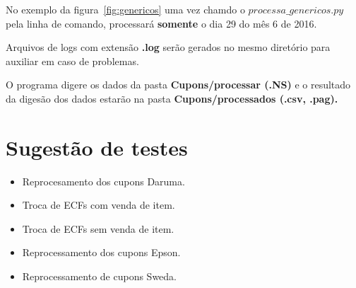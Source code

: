 \documentclass{article}      %
\begin{document}
No exemplo da figura~\ref{fig:genericos} uma vez chamdo o $processa\_genericos.py$ pela linha de comando, processará \textbf{somente} o dia 29 do mês 6 de 2016.

Arquivos de logs com extensão \textbf{.log} serão gerados no mesmo diretório para auxiliar em caso de problemas.

O programa digere os dados da pasta \textbf{Cupons/processar (.NS)} e o resultado da digesão dos dados estarão na pasta \textbf{Cupons/processados (.csv, .pag).}



\section{Sugestão de testes}

\begin{itemize}
    \item Reprocesamento dos cupons Daruma.
    \item Troca de ECFs com venda de item.
    \item Troca de ECFs sem venda de item.
    \item Reprocessamento dos cupons Epson.
    \item Reprocessamento de cupons Sweda.
\end{itemize}
\end{document}
